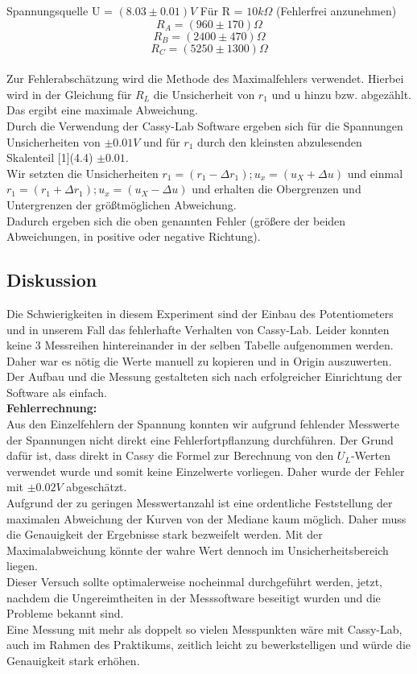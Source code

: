 \documentclass[12pt,a4paper]{article}
\begin{document}
\begin{multicols}{2}
\noindent
Spannungsquelle U = $(8.03 \pm 0.01)V$
Für R = $10k\Omega$ (Fehlerfrei anzunehmen)\\
$$R_A =  (960 \pm 170)\Omega$$
$$R_B =  (2400 \pm 470)\Omega$$
$$R_C =  (5250\pm 1300)\Omega$$
\\
Zur Fehlerabschätzung wird die Methode des Maximalfehlers verwendet. Hierbei wird in der Gleichung für $R_L$ die Unsicherheit von $r_1$ und u hinzu bzw. abgezählt. Das ergibt eine maximale Abweichung.\\

Durch die Verwendung der Cassy-Lab Software ergeben sich für die Spannungen Unsicherheiten von $\pm 0.01V$ und für $r_1$ durch den kleinsten abzulesenden Skalenteil [1](4.4) $\pm 0.01$.\\

Wir setzten die Unsicherheiten $r_1 = (r_1- \Delta r_1); u_x = (u_X + \Delta u)$ und einmal $r_1 = (r_1+ \Delta r_1); u_x = (u_X - \Delta u)$ und erhalten die Obergrenzen und Untergrenzen der größtmöglichen Abweichung.\\
Dadurch ergeben sich die oben genannten Fehler (größere der beiden Abweichungen, in positive oder negative Richtung).


\subsection{Diskussion}
Die Schwierigkeiten in diesem Experiment sind der Einbau des Potentiometers und in unserem Fall das fehlerhafte Verhalten von Cassy-Lab. Leider konnten keine 3 Messreihen hintereinander in der selben Tabelle aufgenommen werden. Daher war es nötig die Werte manuell zu kopieren und in Origin auszuwerten. Der Aufbau und die Messung gestalteten sich nach erfolgreicher Einrichtung der Software als einfach. \\
\textbf{Fehlerrechnung:}\\
Aus den Einzelfehlern der Spannung konnten wir aufgrund fehlender Messwerte der Spannungen nicht direkt eine Fehlerfortpflanzung durchführen. Der Grund dafür ist, dass direkt in Cassy die Formel zur Berechnung von den $U_L$-Werten verwendet wurde und somit keine Einzelwerte vorliegen. Daher wurde der Fehler mit $\pm 0.02V$ abgeschätzt.\\
Aufgrund der zu geringen Messwertanzahl ist eine ordentliche Feststellung der maximalen Abweichung der Kurven von der Mediane kaum möglich. Daher muss die Genauigkeit der Ergebnisse stark bezweifelt werden. Mit der Maximalabweichung könnte der wahre Wert dennoch im Unsicherheitsbereich liegen.\\
Dieser Versuch sollte optimalerweise nocheinmal durchgeführt werden, jetzt, nachdem die Ungereimtheiten in der Messsoftware beseitigt wurden und die Probleme bekannt sind.\\
Eine Messung mit mehr als doppelt so vielen Messpunkten wäre mit Cassy-Lab, auch im Rahmen des Praktikums, zeitlich leicht zu bewerkstelligen und würde die Genauigkeit stark erhöhen.



\end{multicols}
\end{document}
